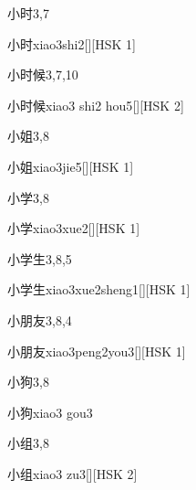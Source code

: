 \begin{entry}{小时}{3,7}
  \begin{phonetics}{小时}{xiao3shi2}[][HSK 1]
  \end{phonetics}
\end{entry}

\begin{entry}{小时候}{3,7,10}
  \begin{phonetics}{小时候}{xiao3 shi2 hou5}[][HSK 2]
  \end{phonetics}
\end{entry}

\begin{entry}{小姐}{3,8}
  \begin{phonetics}{小姐}{xiao3jie5}[][HSK 1]
  \end{phonetics}
\end{entry}

\begin{entry}{小学}{3,8}
  \begin{phonetics}{小学}{xiao3xue2}[][HSK 1]
  \end{phonetics}
\end{entry}

\begin{entry}{小学生}{3,8,5}
  \begin{phonetics}{小学生}{xiao3xue2sheng1}[][HSK 1]
  \end{phonetics}
\end{entry}

\begin{entry}{小朋友}{3,8,4}
  \begin{phonetics}{小朋友}{xiao3peng2you3}[][HSK 1]
  \end{phonetics}
\end{entry}

\begin{entry}{小狗}{3,8}
  \begin{phonetics}{小狗}{xiao3 gou3}
  \end{phonetics}
\end{entry}

\begin{entry}{小组}{3,8}
  \begin{phonetics}{小组}{xiao3 zu3}[][HSK 2]
  \end{phonetics}
\end{entry}

